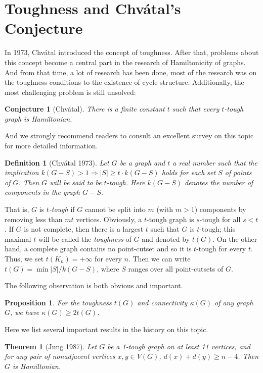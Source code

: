 \documentclass[12pt]{report}
\newtheorem{theorem}{Theorem}
\newtheorem{definition}{Definition}
\newtheorem{proposition}{Proposition}
\newtheorem{conjecture}{Conjecture}
\begin{document}
\section{Toughness and Chv{\'a}tal's Conjecture}
In 1973, Chv{\'a}tal \cite{chvatal1973tough} introduced the concept of toughness. After that, problems about this concept become a central part in the research of Hamiltonicity of graphs. And from that time, a lot of research has been done, most of the research was on the toughness conditions to the existence of cycle structure. Additionally, the most challenging problem is still unsolved: 
\begin{conjecture}[Chv{\'a}tal]\label{cj1chath}
There is a finite constant $t$ such that every $t$-tough graph is Hamiltonian.
\end{conjecture}
And we strongly recommend readers to consult an excellent survey \cite{bauer2006toughness} on this topic for more detailed information.

\begin{definition}[Chv{\'a}tal 1973]\label{c1}
Let $G$ be a graph and $t$ a real number such that the implication $k(G-S)>1\Rightarrow |S|\ge t\cdot k(G-S)$ holds for each set $S$ of points of $G$. Then $G$ will be said to be $t$-tough. Here $k(G-S)$ denotes the number of components in the graph $G-S$.
\end{definition}
That is, $G$ is {\em $t$-tough} if $G$ cannot be split into $m$ (with $m>1$) components by removing less than $mt$ vertices.
Obviously, a $t$-tough graph is $s$-tough for all $s<t$. If $G$ is not complete, then there is a largest $t$ such that $G$ is $t$-tough; this maximal $t$ will be called the {\em toughness} of $G$ and denoted by $t(G)$. On the other hand, a complete graph contains no point-cutset and so it is $t$-tough for every $t$. Thus, we set $t(K_n)=+\infty$ for every $n$. Then we can write $t(G)=\min|S|/k(G-S)$, where $S$ ranges over all point-cutsets of $G$.

The following observation is both obvious and important.
\begin{proposition}\label{prokg2t}
For the toughness $t(G)$ and connectivity $\kappa(G)$ of any graph $G$, we have $\kappa(G)\ge2t(G)$.
\end{proposition}





Here we list several important results in the history on this topic.
\begin{theorem}[Jung 1987]
Let $G$ be a 1-tough graph on at least 11 vertices, and for any pair of nonadjacent vertices $x,y\in V(G)$, $d(x)+d(y)\ge n-4$. Then $G$ is Hamiltonian.
\end{theorem}
\end{document}
